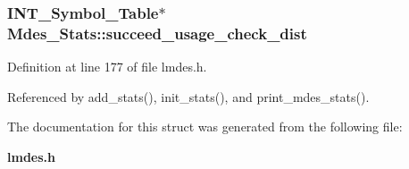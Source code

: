 \subsubsection{\setlength{\rightskip}{0pt plus 5cm}\bf{INT\_\-Symbol\_\-Table}$\ast$ \bf{Mdes\_\-Stats::succeed\_\-usage\_\-check\_\-dist}}\label{structMdes__Stats_b1a9acc2ff4c8e6658403bb83ad47155}




Definition at line 177 of file lmdes.h.

Referenced by add\_\-stats(), init\_\-stats(), and print\_\-mdes\_\-stats().

The documentation for this struct was generated from the following file:\begin{CompactItemize}
\item 
\bf{lmdes.h}\end{CompactItemize}
